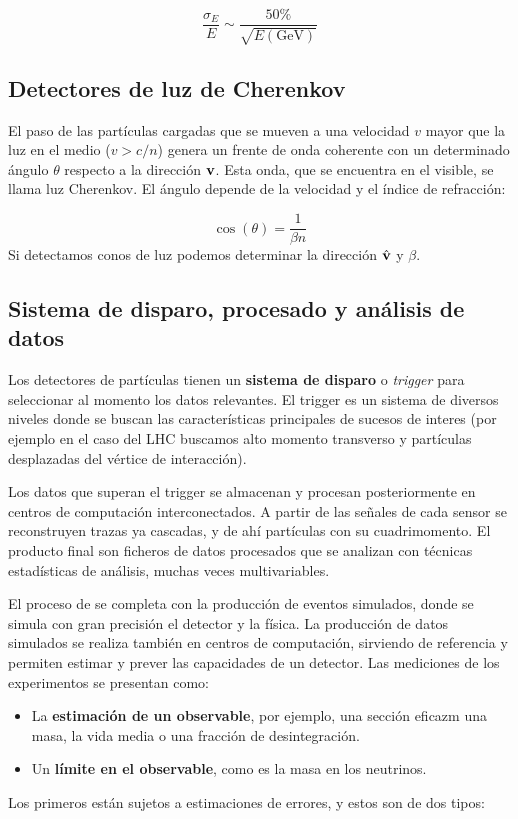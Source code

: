 \begin{equation}
	\frac{\sigma_E}{E} \sim \frac{50\%}{\sqrt{E(\text{GeV})}}
\end{equation}

\subsection{Detectores de luz de Cherenkov}

El paso de las partículas cargadas que se mueven a una velocidad $v$ mayor que la luz en el medio ($v>c/n$) genera un frente de onda coherente con un determinado ángulo $\theta$ respecto a la dirección $\mathbf{v}$. Esta onda, que se encuentra en el visible, se llama luz Cherenkov. El ángulo depende de la velocidad y el índice de refracción:

\begin{equation}
	\cos (\theta) = \frac{1}{\beta n}
\end{equation}
Si detectamos conos de luz podemos determinar la dirección $\hat{\mathbf{v}}$ y $\beta$. 


\subsection{Sistema de disparo, procesado y análisis de datos}

Los detectores de partículas tienen un \textbf{sistema de disparo} o \textit{trigger} para seleccionar al momento los datos relevantes. El trigger es un sistema de diversos niveles donde se buscan las características principales de sucesos de interes (por ejemplo en el caso del LHC buscamos alto momento transverso y partículas desplazadas del vértice de interacción).

Los datos que superan el trigger se almacenan y procesan posteriormente en centros de computación interconectados. A partir de las señales de cada sensor se reconstruyen trazas ya cascadas, y de ahí partículas con su cuadrimomento. El producto final son ficheros de datos procesados que se analizan con técnicas estadísticas de análisis, muchas veces multivariables. 

El proceso de se completa con la producción de eventos simulados, donde se simula con gran precisión el detector y la física. La producción de datos simulados se realiza también en centros de computación, sirviendo de referencia y permiten estimar y prever las capacidades de un detector. Las mediciones de los experimentos se presentan como:

\begin{itemize}
	\item La \textbf{estimación de un observable}, por ejemplo, una sección eficazm una masa, la vida media o una fracción de desintegración.
	\item Un \textbf{límite en el observable}, como es la masa en los neutrinos.
\end{itemize}
Los primeros están sujetos a estimaciones de errores, y estos son de dos tipos:


